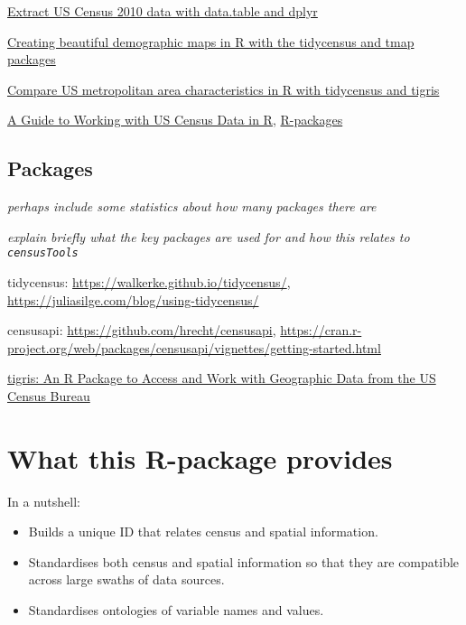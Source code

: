 \documentclass[12pt,]{article}
\providecommand{\tightlist}{%
  \setlength{\itemsep}{0pt}\setlength{\parskip}{0pt}}
\begin{document}
\href{https://gl-li.netlify.com/2017/08/29/process-2010-census-data-with-data-table/}{Extract US Census 2010 data with data.table and dplyr}

\href{http://zevross.com/blog/2018/10/02/creating-beautiful-demographic-maps-in-r-with-the-tidycensus-and-tmap-packages/}{Creating beautiful demographic maps in R with the tidycensus and tmap packages}

\href{https://walkerke.github.io/2017/06/comparing-metros/}{Compare US metropolitan area characteristics in R with tidycensus and tigris}

\href{https://rconsortium.github.io/censusguide/}{A Guide to Working with US Census Data in R}, \href{https://rconsortium.github.io/censusguide/r-packages-all.html}{R-packages}

\hypertarget{packages}{%
\subsection{Packages}\label{packages}}

\emph{perhaps include some statistics about how many packages there are}

\emph{explain briefly what the key packages are used for and how this relates to \texttt{censusTools}}

tidycensus: \url{https://walkerke.github.io/tidycensus/}, \url{https://juliasilge.com/blog/using-tidycensus/}

censusapi: \url{https://github.com/hrecht/censusapi}, \url{https://cran.r-project.org/web/packages/censusapi/vignettes/getting-started.html}

\href{https://journal.r-project.org/archive/2016/RJ-2016-043/RJ-2016-043.pdf}{tigris: An R Package to Access and Work with Geographic Data from the US Census Bureau}

\hypertarget{what-this-r-package-provides}{%
\section{What this R-package provides}\label{what-this-r-package-provides}}

In a nutshell:

\begin{itemize}
\tightlist
\item
  Builds a unique ID that relates census and spatial information.
\item
  Standardises both census and spatial information so that they are compatible across large swaths of data sources.
\item
  Standardises ontologies of variable names and values.
\end{itemize}
\end{document}
